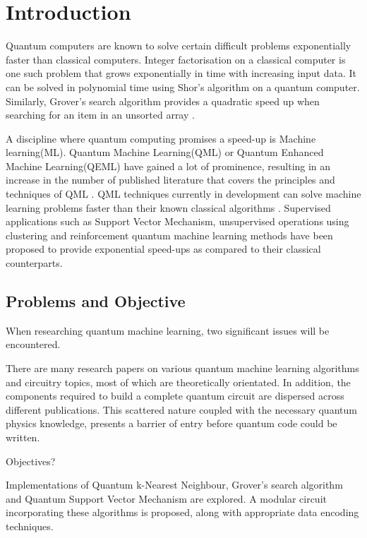 \chapter{Introduction}
Quantum computers are known to solve certain difficult problems exponentially faster than classical computers. Integer factorisation on a classical computer is one such problem that grows exponentially in time with increasing input data. It can be solved in polynomial time using Shor’s algorithm \cite{Intro1} on a quantum computer. Similarly, Grover’s search algorithm  provides a quadratic speed up when searching for an item in an unsorted array \cite{Intro2}. %

A discipline where quantum computing promises a speed-up is Machine learning(ML). Quantum Machine Learning(QML) or Quantum Enhanced Machine Learning(QEML) have gained a lot of prominence, resulting in an increase in the number of published literature that covers the principles and techniques of QML \cite{Schuld_2014In5}. QML techniques currently in development can solve machine learning problems faster than their known classical algorithms \cite{Khan2019}. Supervised applications such as Support Vector Mechanism, unsupervised operations using clustering and reinforcement quantum machine learning methods have been proposed to provide exponential speed-ups as compared to their classical counterparts.


\section{Problems and Objective}
When researching quantum machine learning, two significant issues will be encountered. 

There are many research papers on various quantum machine learning algorithms and circuitry topics, most of which are theoretically orientated. In addition, the components required to build a complete quantum circuit are dispersed across different publications. This scattered nature coupled with the necessary quantum physics knowledge, presents a barrier of entry before quantum code could be written.


Objectives?


Implementations of Quantum k-Nearest Neighbour, Grover's search algorithm and Quantum Support Vector Mechanism are explored. A modular circuit incorporating these algorithms is proposed, along with appropriate data encoding techniques.  

